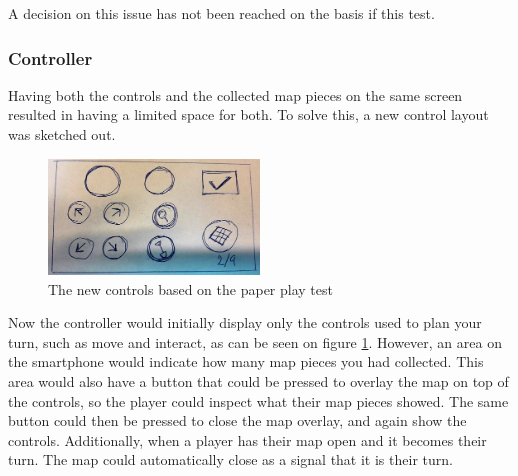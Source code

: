 A decision on this issue has not been reached on the basis if this test.

\subsubsection{Controller}
Having both the controls and the collected map pieces on the same screen resulted in having a limited space for both. To solve this, a new control layout was sketched out.

\begin{figure}[h]
\centering
\includegraphics[width=0.5\textwidth]{figures/RevisedControl} 
\caption{The new controls based on the paper play test}\label{fig:PPtest4}
\end{figure}

Now the controller would initially display only the controls used to plan your turn, such as move and interact, as can be seen on figure \ref{fig:PPtest4}. However, an area on the smartphone would indicate how many map pieces you had collected. This area would also have a button that could be pressed to overlay the map on top of the controls, so the player could inspect what their map pieces showed. The same button could then be pressed to close the map overlay, and again show the controls. Additionally, when a player has their map open and it becomes their turn. The map could automatically close as a signal that it is their turn.

